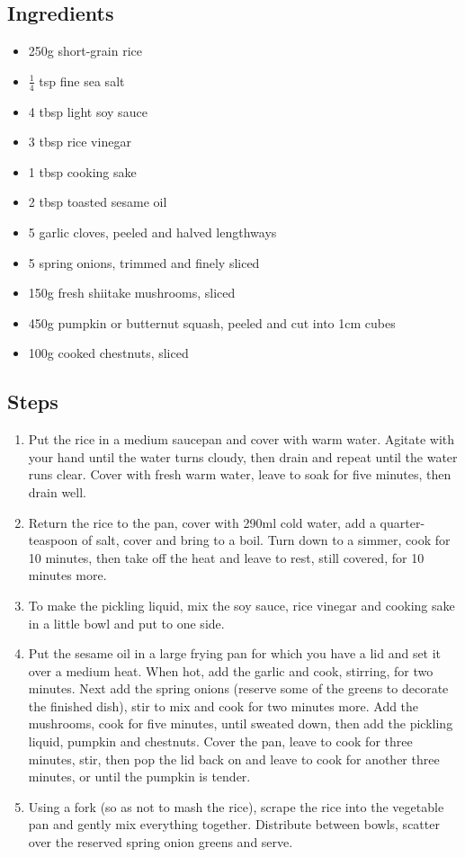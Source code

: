 \documentclass{book}
\begin{document}
\subsection*{Ingredients}
\begin{itemize}
\item 250g short-grain rice
\item $\frac{1}{4}$ tsp fine sea salt
\item 4 tbsp light soy sauce
\item 3 tbsp rice vinegar
\item 1 tbsp cooking sake
\item 2 tbsp toasted sesame oil 
\item 5 garlic cloves, peeled and halved lengthways
\item 5 spring onions, trimmed and finely sliced 
\item 150g fresh shiitake mushrooms, sliced 
\item 450g pumpkin or butternut squash, peeled and cut into 1cm cubes 
\item 100g cooked chestnuts, sliced
\end{itemize}

\subsection*{Steps}
\begin{enumerate}
\item Put the rice in a medium saucepan and cover with warm water. Agitate with your hand until the water turns cloudy, then drain and repeat until the water runs clear. Cover with fresh warm water, leave to soak for five minutes, then drain well.
\item Return the rice to the pan, cover with 290ml cold water, add a quarter-teaspoon of salt, cover and bring to a boil. Turn down to a simmer, cook for 10 minutes, then take off the heat and leave to rest, still covered, for 10 minutes more.
\item To make the pickling liquid, mix the soy sauce, rice vinegar and cooking sake in a little bowl and put to one side.
\item Put the sesame oil in a large frying pan for which you have a lid and set it over a medium heat. When hot, add the garlic and cook, stirring, for two minutes. Next add the spring onions (reserve some of the greens to decorate the finished dish), stir to mix and cook for two minutes more. Add the mushrooms, cook for five minutes, until sweated down, then add the pickling liquid, pumpkin and chestnuts. Cover the pan, leave to cook for three minutes, stir, then pop the lid back on and leave to cook for another three minutes, or until the pumpkin is tender.
\item Using a fork (so as not to mash the rice), scrape the rice into the vegetable pan and gently mix everything together. Distribute between bowls, scatter over the reserved spring onion greens and serve.
\end{enumerate}
\newpage
\end{document}
